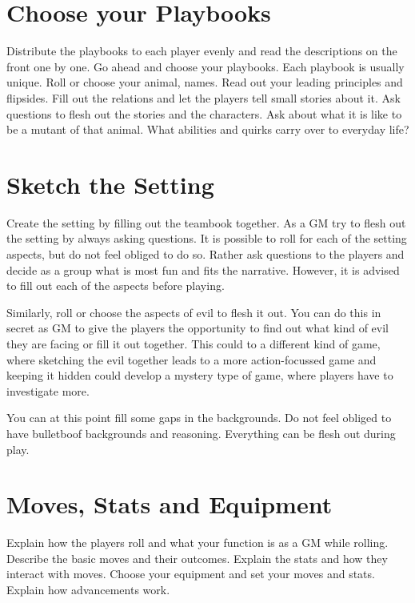 \documentclass{book}
\begin{document}
\section*{Choose your Playbooks}
Distribute the playbooks to each player evenly and read the descriptions on the front one by one.
Go ahead and choose your playbooks.
Each playbook is usually unique.
Roll or choose your animal, names.
Read out your leading principles and flipsides.
Fill out the relations and let the players tell small stories about it.
Ask questions to flesh out the stories and the characters.
Ask about what it is like to be a mutant of that animal.
What abilities and quirks carry over to everyday life?

\section*{Sketch the Setting}
Create the setting by filling out the teambook together.
As a GM try to flesh out the setting by always asking questions.
It is possible to roll for each of the setting aspects, but do not feel obliged to do so.
Rather ask questions to the players and decide as a group what is most fun and fits the narrative.
However, it is advised to fill out each of the aspects before playing.

Similarly, roll or choose the aspects of evil to flesh it out.
You can do this in secret as GM to give the players the opportunity to find out what kind of evil they are facing or fill it out together.
This could to a different kind of game, where sketching the evil together leads to a more action-focussed game and keeping it hidden could develop a mystery type of game, where players have to investigate more.

You can at this point fill some gaps in the backgrounds.
Do not feel obliged to have bulletboof backgrounds and reasoning.
Everything can be flesh out during play.

\section*{Moves, Stats and Equipment}
Explain how the players roll and what your function is as a GM while rolling.
Describe the basic moves and their outcomes.
Explain the stats and how they interact with moves.
Choose your equipment and set your moves and stats.
Explain how advancements work.


\newpage













\end{document}
